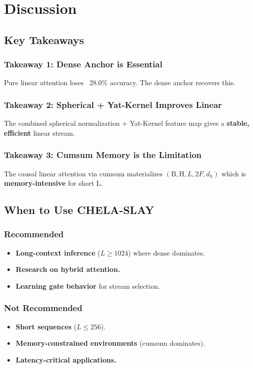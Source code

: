 \section{Discussion}

\subsection{Key Takeaways}

\subsubsection{Takeaway 1: Dense Anchor is Essential}

Pure linear attention loses ~28.0\% accuracy. The dense anchor 
recovers this.

\subsubsection{Takeaway 2: Spherical + Yat-Kernel Improves Linear}

The combined spherical normalization + Yat-Kernel feature map gives a 
\textbf{stable, efficient} linear stream.

\subsubsection{Takeaway 3: Cumsum Memory is the Limitation}

The causal linear attention via cumsum materializes 
$(\text{B}, \text{H}, L, 2F, d_h)$ which is \textbf{memory-intensive} for short L.

\subsection{When to Use CHELA-SLAY}

\subsubsection{Recommended}
\begin{itemize}
\item \textbf{Long-context inference} ($L \geq 1024$) where dense dominates.
\item \textbf{Research on hybrid attention.}
\item \textbf{Learning gate behavior} for stream selection.

\end{itemize}
\subsubsection{Not Recommended}
\begin{itemize}
\item \textbf{Short sequences} ($L \leq 256$).
\item \textbf{Memory-constrained environments} (cumsum dominates).
\item \textbf{Latency-critical applications.}

\end{itemize}
